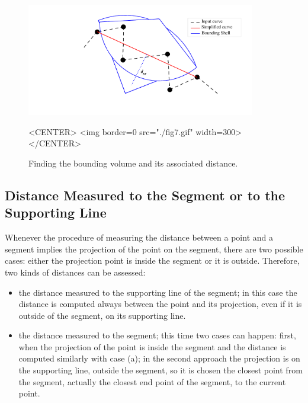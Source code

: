 \begin{figure}[h]
\begin{ccTexOnly}
\begin{center}
\includegraphics[width=10cm]{Polygonal_approximation_d/fig7} 
\end{center}
\end{ccTexOnly}
\caption{Finding the bounding volume and its associated distance.
\label{Simplification_Fig_Bounded}}
\begin{ccHtmlOnly}
<CENTER>
<img border=0 src="./fig7.gif" width=300>
</CENTER>
\end{ccHtmlOnly}
\end{figure}




\subsection{Distance Measured to the Segment or to the Supporting Line}

Whenever the procedure of measuring the distance between a point and a
segment implies the projection of the point on the segment, there are
two possible cases: either the projection point is inside the segment
or it is outside. Therefore, two kinds of distances can be assessed:

\begin{itemize}
\item the distance measured to the supporting line of the segment; in this
case the distance is computed always between the point and its
projection, even if it is outside of the segment, on its supporting line.

\item the distance measured to the segment; this time two cases can
happen: first, when the projection of the point is inside the segment
and the distance is computed similarly with case (a); in the second
approach the projection is on the supporting line, outside the segment,
so it is chosen the closest point from the segment, actually the
closest end point of the segment, to the current point.
\end{itemize}






